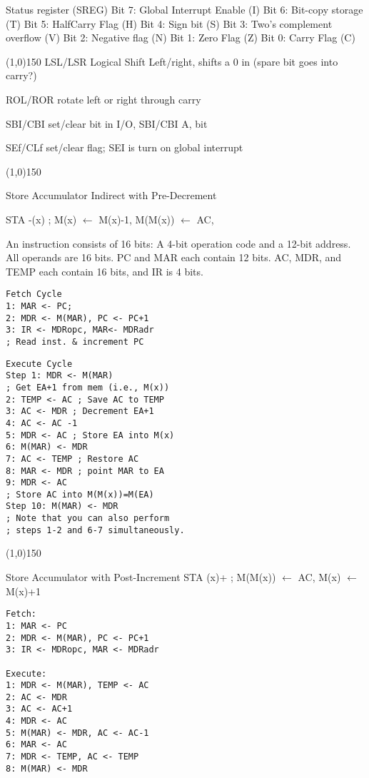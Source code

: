\documentclass[8pt]{article}
\begin{document}
\begin{multicols}{3}
Status register (SREG) 
Bit 7: Global Interrupt Enable (I)
Bit 6: Bit-copy storage (T)
Bit 5: HalfCarry Flag (H)
Bit 4: Sign bit (S)
Bit 3: Two's complement overflow (V)
Bit 2: Negative flag (N)
Bit 1: Zero Flag (Z)
Bit 0: Carry Flag (C)

\line(1,0){150}
LSL/LSR Logical Shift Left/right, shifts a 0 in (spare bit goes into carry?)

ROL/ROR rotate left or right through carry

SBI/CBI set/clear bit in I/O, SBI/CBI A, bit

SEf/CLf set/clear flag; SEI is turn on global interrupt

\line(1,0){150}

Store Accumulator Indirect with Pre-Decrement

STA -(x) ; M(x) $\leftarrow$ M(x)-1, M(M(x)) $\leftarrow$ AC,

An instruction consists of 16 bits: A 4-bit operation code and a 12-bit
address. All operands are 16 bits. PC and MAR each contain 12 bits. AC, MDR,
and TEMP each contain 16 bits, and IR is 4 bits.


\begin{verbatim}
Fetch Cycle
1: MAR <- PC;
2: MDR <- M(MAR), PC <- PC+1
3: IR <- MDRopc, MAR<- MDRadr 
; Read inst. & increment PC
\end{verbatim}

\begin{verbatim}
Execute Cycle
Step 1: MDR <- M(MAR) 
; Get EA+1 from mem (i.e., M(x))
2: TEMP <- AC ; Save AC to TEMP
3: AC <- MDR ; Decrement EA+1
4: AC <- AC -1
5: MDR <- AC ; Store EA into M(x)
6: M(MAR) <- MDR
7: AC <- TEMP ; Restore AC
8: MAR <- MDR ; point MAR to EA
9: MDR <- AC 
; Store AC into M(M(x))=M(EA)
Step 10: M(MAR) <- MDR
; Note that you can also perform 
; steps 1-2 and 6-7 simultaneously.
\end{verbatim}


\line(1,0){150}

Store Accumulator with Post-Increment
STA (x)+ ; M(M(x)) $\leftarrow$ AC, M(x) $\leftarrow$ M(x)+1

\begin{verbatim}
Fetch: 
1: MAR <- PC
2: MDR <- M(MAR), PC <- PC+1
3: IR <- MDRopc, MAR <- MDRadr

Execute: 
1: MDR <- M(MAR), TEMP <- AC
2: AC <- MDR
3: AC <- AC+1
4: MDR <- AC
5: M(MAR) <- MDR, AC <- AC-1
6: MAR <- AC
7: MDR <- TEMP, AC <- TEMP
8: M(MAR) <- MDR
\end{verbatim}


\end{multicols}
\end{document}
